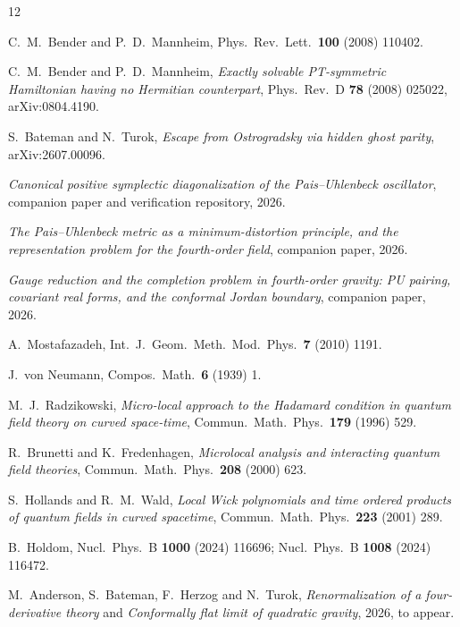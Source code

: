 \documentclass[11pt]{article}
\theoremstyle{definition}
\theoremstyle{remark}
\begin{document}
\begin{thebibliography}{12}

C.~M.~Bender and P.~D.~Mannheim,
Phys.\ Rev.\ Lett.\ \textbf{100} (2008) 110402.

C.~M.~Bender and P.~D.~Mannheim,
\emph{Exactly solvable PT-symmetric Hamiltonian having no Hermitian
counterpart},
Phys.\ Rev.\ D \textbf{78} (2008) 025022, arXiv:0804.4190.

S.~Bateman and N.~Turok,
\emph{Escape from Ostrogradsky via hidden ghost parity},
arXiv:2607.00096.

\emph{Canonical positive symplectic diagonalization of the Pais--Uhlenbeck
oscillator}, companion paper and verification repository, 2026.

\emph{The Pais--Uhlenbeck metric as a minimum-distortion principle, and
the representation problem for the fourth-order field}, companion paper,
2026.

\emph{Gauge reduction and the completion problem in fourth-order
gravity: PU pairing, covariant real forms, and the conformal Jordan
boundary}, companion paper, 2026.

A.~Mostafazadeh,
Int.\ J.\ Geom.\ Meth.\ Mod.\ Phys.\ \textbf{7} (2010) 1191.

J.~von Neumann,
Compos.\ Math.\ \textbf{6} (1939) 1.

M.~J.~Radzikowski,
\emph{Micro-local approach to the Hadamard condition in quantum field
theory on curved space-time},
Commun.\ Math.\ Phys.\ \textbf{179} (1996) 529.

R.~Brunetti and K.~Fredenhagen,
\emph{Microlocal analysis and interacting quantum field theories},
Commun.\ Math.\ Phys.\ \textbf{208} (2000) 623.

S.~Hollands and R.~M.~Wald,
\emph{Local Wick polynomials and time ordered products of quantum fields
in curved spacetime},
Commun.\ Math.\ Phys.\ \textbf{223} (2001) 289.

B.~Holdom,
Nucl.\ Phys.\ B \textbf{1000} (2024) 116696;
Nucl.\ Phys.\ B \textbf{1008} (2024) 116472.

M.~Anderson, S.~Bateman, F.~Herzog and N.~Turok,
\emph{Renormalization of a four-derivative theory} and
\emph{Conformally flat limit of quadratic gravity}, 2026, to appear.

\end{thebibliography}
\end{document}
